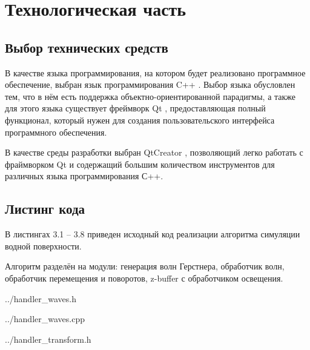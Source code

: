 \chapter{Технологическая часть}


\section{Выбор технических средств}

В качестве языка программирования, на котором будет реализовано программное обеспечение, выбран язык программирования C++ \cite{cpp}. Выбор языка обусловлен тем, что в нём есть поддержка объектно-ориентированной парадигмы, а также для этого языка существует фреймворк Qt \cite{qt}, предоставляющая полный функционал, который нужен для создания пользовательского интерфейса программного обеспечения. 

В качестве среды разработки выбран QtCreator \cite{qtc}, позволяющий легко работать с фраймворком  Qt и содержащий большим количеством инструментов для различных языка программирования С++.

\section{Листинг кода}

В листингах 3.1 – 3.8 приведен исходный код реализации алгоритма симуляции водной поверхности.

Алгоритм разделён на модули: генерация волн Герстнера, обработчик волн, обработчик перемещения и поворотов, z-buffer с обработчиком освещения.


\begin{lstinputlisting}[
	caption={Заголовочный файл модуля обработчик волн.},
	label={lst:mhc},
	style={cpp},
	]{../handler_waves.h}
\end{lstinputlisting}


\begin{lstinputlisting}[
	caption={Файл реализации модуля обработчик волн.},
	label={lst:mhc},
	style={cpp},
	]{../handler_waves.cpp}
\end{lstinputlisting}


\begin{lstinputlisting}[
	caption={Заголовочный файл обработчика перемещения и поворотов.},
	label={lst:mhc},
	style={cpp},
	]{../handler_transform.h}
\end{lstinputlisting}


